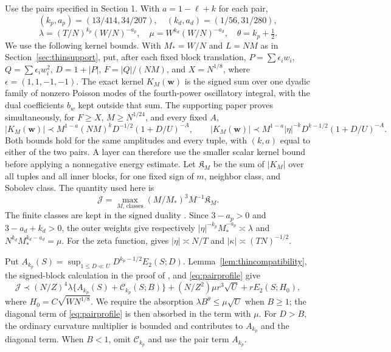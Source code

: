 \documentclass[11pt]{amsart}
\numberwithin{equation}{section}
\begin{document}
Use the pairs specified in Section 1. With $a=1-\ell+k$ for each pair,
\[
 (k_p,a_p)=(13/414,34/207),\quad (k_d,a_d)=(1/56,31/280),
\]
\[
 \lambda=(T/N)^{k_p}(W/N)^{-a_p},\quad
 \mu=W^{k_d}(W/N)^{-a_d},\quad \theta=k_p+\tfrac12.
\]
We use the following kernel bounds. With $M_*=W/N$ and $L=NM$ as in
Section~\ref{sec:thinsupport}, put, after each fixed block translation,
$P=\sum\epsilon_iw_i$, $Q=\sum\epsilon_iw_i^2$,
$D=1+|P|$, $F=|Q|/(NM)$, and $X=N^{1/8}$, where
$\epsilon=(1,1,-1,-1)$. The exact kernel $K_M(\mathbf w)$ is the signed
sum over one dyadic family of nonzero Poisson modes of the fourth-power
oscillatory integral, with the dual coefficients $b_w$ kept outside
that sum. The supporting paper
\cite[Corollary~\ref*{six-cor:two}]{Weighted} proves simultaneously,
for $F\ge X$, $M\ge N^{1/24}$, and every fixed $A$,
\[
 |K_M(\mathbf w)|\prec M^{1-a}(NM)^kD^{-1/2}(1+D/U)^{-A},
 \qquad
 |K_M(\mathbf w)|\prec M^{1-a}|\eta|^{-k}
                           D^{k-1/2}(1+D/U)^{-A}.
\]
Both bounds hold for the same amplitudes and every tuple, with $(k,a)$
equal to either of the two pairs. A layer can therefore use the smaller scalar
kernel bound before applying a nonnegative energy estimate.
Let $\mathfrak K_M$ be the sum of $|K_M|$ over all tuples and all
inner blocks, for one fixed sign of $m$, neighbor class, and Sobolev class.
The quantity used here is
\[
 \mathcal J=\max_{M,\,\mathrm{classes}}
       (M/M_*)^3M^{-1}\mathfrak K_M.
\]
The finite classes are kept in the signed duality
\cite[Proposition~\ref*{six-prop:dualityproof}]{Weighted}. Since
$3-a_p>0$ and $3-a_d+k_d>0$, the outer weights give respectively
$|\eta|^{-k_p}M_*^{-a_p}\asymp\lambda$ and
$N^{k_d}M_*^{k_d-a_d}=\mu$. For the zeta function,
\cite[Lemma~\ref*{six-lem:atkinson}]{Weighted} gives
$|\eta|\asymp N/T$ and $|\kappa|\asymp(TN)^{-1/2}$.

Put \(A_{k_p}(S)=\sup_{1\le D\ll U}D^{k_p-1/2}E_2(S;D)\).
Lemma~\ref{lem:thincompatibility}, the signed-block calculation in the
proof of \cite[Proposition~\ref*{six-prop:model}]{Weighted}, and
\eqref{eq:pairprofile} give
\begin{equation}\label{eq:J}
\mathcal J\prec
 (N/Z)^4\lambda\{A_{k_p}(S)+\mathcal C_{k_p}(S;B)\}
 +(N/Z^2)\mu r^3\sqrt U+rE_2(S;H_0),
\end{equation}
where \(H_0=C\sqrt{WN^{1/8}}\). We require the absorption
\(\lambda B^\theta\le\mu\sqrt U\) when \(B\ge1\); the diagonal term of
\eqref{eq:pairprofile} is then absorbed in the term with $\mu$.
For \(D>B\), the ordinary curvature multiplier is bounded and contributes
to \(A_{k_p}\) and the diagonal term. When \(B<1\), omit
\(\mathcal C_{k_p}\) and use the pair term \(A_{k_p}\).
\end{document}
